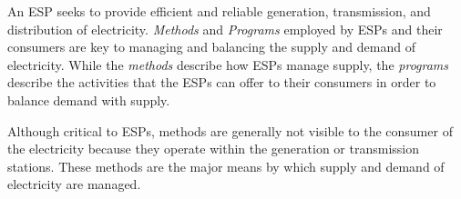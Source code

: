 %
%
%
\label{sub:EPP}
An ESP seeks to provide efficient and reliable generation, transmission, and 
distribution of electricity. \emph{Methods} and \emph{Programs} employed by ESPs and their consumers 
are key to managing and balancing the supply and demand of electricity. While the \textit{methods} 
describe how ESPs manage supply, the \textit{programs} describe the activities that 
the ESPs can offer to their consumers in order to balance demand with supply.

Although critical to ESPs, methods are generally not visible to the consumer of the electricity because they
operate within the generation or transmission stations. These methods are the major means by which supply and demand of electricity are managed.

